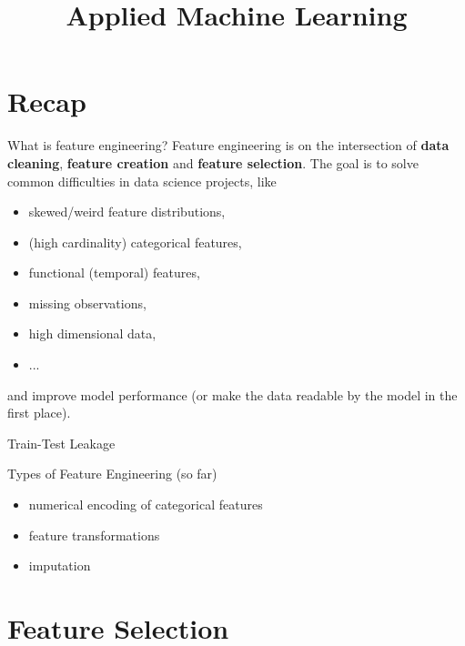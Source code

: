 \documentclass[11pt,compress,t,notes=noshow, xcolor=table]{beamer}
\title{Applied Machine Learning}
\date{}
\begin{document}


\section{Recap}

\begin{frame}{What is feature engineering?}
Feature engineering is on the intersection of \textbf{data cleaning}, \textbf{feature
creation} and \textbf{feature selection}.
\vfill
The goal is to solve common difficulties in data science projects, like
\vfill
\begin{itemize}
    \item skewed/weird feature distributions,
    \item (high cardinality) categorical features,
    \item functional (temporal) features,
    \item missing observations,
    \item high dimensional data,
    \item ...
\end{itemize}
\vfill
and improve model performance (or make the data readable by the model in the first place).
\end{frame}

\begin{frame}{Train-Test Leakage}

\end{frame}

\begin{frame}{Types of Feature Engineering (so far)}
\begin{itemize}
    \item numerical encoding of categorical features
    \item feature transformations
    \item imputation
\end{itemize}
\end{frame}

\section{Feature Selection}
\end{document}
